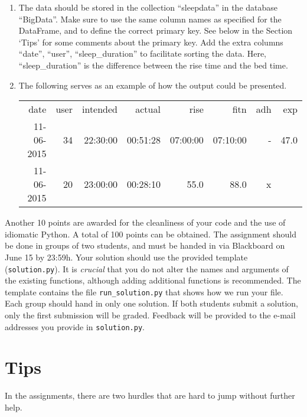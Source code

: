 \documentclass[a4paper]{report}
\theoremstyle{definition}
\begin{document}
\begin{enumerate}

\item The data should be stored in the collection ``sleepdata'' in the
database ``BigData''.  Make sure to use the same column names as specified
for the DataFrame, and to define the correct primary key. See below in the
Section `Tips' for some comments about the primary key. Add the extra
columns ``date'', ``user'', ``sleep\_duration'' to facilitate sorting
the data. Here, ``sleep\_duration'' is the difference between the rise
time and the bed time.

\item The following serves as an example of how the
output could be presented.

\begin{tabular}{|r r r r r r r r|}
\hline
date & user & intended & actual & rise & fitn & adh & exp \\
11-06-2015 & 34 & 22:30:00 & 00:51:28 & 07:00:00 & 07:10:00 & - & 47.0 \\
11-06-2015 & 20 & 23:00:00 & 00:28:10 & 55.0 & 88.0 & x & \\
\hline
\end{tabular}

\end{enumerate}

Another 10 points are awarded for the cleanliness of your code and
the use of idiomatic Python. A total of 100 points can be obtained.
The assignment should be done in groups of two students, and must be
handed in via Blackboard on June 15 by 23:59h. Your solution should use
the provided template (\texttt{\small solution.py}). It is \emph{crucial}
that you do not alter the names and arguments of the existing functions,
although adding additional functions is recommended. The template
contains the file \texttt{\small run\_solution.py} that shows how we
run your file. Each group should hand in only one solution. If both
students submit a solution, only the first submission will be graded.
Feedback will be provided to the e-mail addresses you provide in
\texttt{\small solution.py}.


\section*{Tips}

In the assignments, there are two  hurdles that are hard to jump without
further help.
\end{document}
